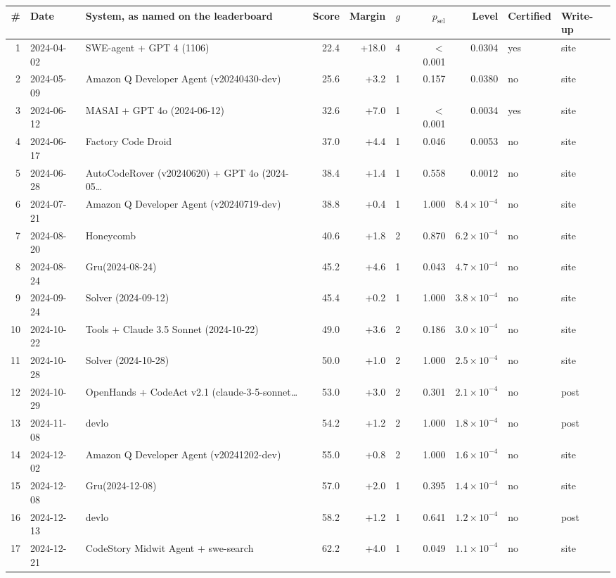 \begin{tabular}{rllrrrrrll}
\toprule
\# & Date & System, as named on the leaderboard & Score & Margin & $g$ & $p_{\mathrm{sel}}$ & Level & Certified & Write-up \\
\midrule
1 & 2024-04-02 & SWE-agent + GPT 4 (1106) & 22.4 & +18.0 & 4 & $<$0.001 & 0.0304 & yes & site \\
2 & 2024-05-09 & Amazon Q Developer Agent (v20240430-dev) & 25.6 & +3.2 & 1 & 0.157 & 0.0380 & no & site \\
3 & 2024-06-12 & MASAI + GPT 4o (2024-06-12) & 32.6 & +7.0 & 1 & $<$0.001 & 0.0034 & yes & site \\
4 & 2024-06-17 & Factory Code Droid & 37.0 & +4.4 & 1 & 0.046 & 0.0053 & no & site \\
5 & 2024-06-28 & AutoCodeRover (v20240620) + GPT 4o (2024-05\ldots & 38.4 & +1.4 & 1 & 0.558 & 0.0012 & no & site \\
6 & 2024-07-21 & Amazon Q Developer Agent (v20240719-dev) & 38.8 & +0.4 & 1 & 1.000 & $8.4\times10^{-4}$ & no & site \\
7 & 2024-08-20 & Honeycomb & 40.6 & +1.8 & 2 & 0.870 & $6.2\times10^{-4}$ & no & site \\
8 & 2024-08-24 & Gru(2024-08-24) & 45.2 & +4.6 & 1 & 0.043 & $4.7\times10^{-4}$ & no & site \\
9 & 2024-09-24 & Solver (2024-09-12) & 45.4 & +0.2 & 1 & 1.000 & $3.8\times10^{-4}$ & no & site \\
10 & 2024-10-22 & Tools + Claude 3.5 Sonnet (2024-10-22) & 49.0 & +3.6 & 2 & 0.186 & $3.0\times10^{-4}$ & no & site \\
11 & 2024-10-28 & Solver (2024-10-28) & 50.0 & +1.0 & 2 & 1.000 & $2.5\times10^{-4}$ & no & site \\
12 & 2024-10-29 & OpenHands + CodeAct v2.1 (claude-3-5-sonnet\ldots & 53.0 & +3.0 & 2 & 0.301 & $2.1\times10^{-4}$ & no & post \\
13 & 2024-11-08 & devlo & 54.2 & +1.2 & 2 & 1.000 & $1.8\times10^{-4}$ & no & post \\
14 & 2024-12-02 & Amazon Q Developer Agent (v20241202-dev) & 55.0 & +0.8 & 2 & 1.000 & $1.6\times10^{-4}$ & no & site \\
15 & 2024-12-08 & Gru(2024-12-08) & 57.0 & +2.0 & 1 & 0.395 & $1.4\times10^{-4}$ & no & site \\
16 & 2024-12-13 & devlo & 58.2 & +1.2 & 1 & 0.641 & $1.2\times10^{-4}$ & no & post \\
17 & 2024-12-21 & CodeStory Midwit Agent + swe-search & 62.2 & +4.0 & 1 & 0.049 & $1.1\times10^{-4}$ & no & site \\

\end{tabular}
